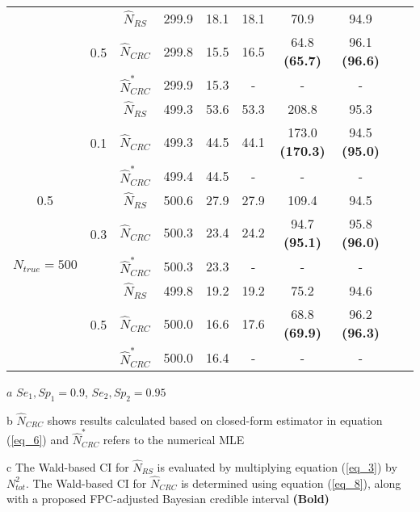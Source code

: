 \documentclass[useAMS,usenatbib,referee]{biom}
\begin{document}
\begin{table}
\begin{threeparttable}[b]
\begin{tabular}{cccccccccc}
     & \multirow{3}{*}{0.5}  & $\hat{N}_{RS}$ & 299.9 & 18.1 & 18.1 & 70.9 & 94.9    \\ \cline{3-8}
     & ~ & $\hat{N}_{CRC}$ & 299.8 & 15.5 & 16.5 & 64.8 \textbf{(65.7)} & 96.1 \textbf{(96.6)}   \\ \cline{3-8}
    ~ & ~ & $\hat{N}_{CRC}^*$ &  299.9 & 15.3  & - & - & -   \\ \hline
    
    & \multirow{3}{*}{0.1} & $\hat{N}_{RS}$ & 499.3 & 53.6 & 53.3 & 208.8 & 95.3  \\ \cline{3-8}
     & ~ & $\hat{N}_{CRC}$ &  499.3 & 44.5 & 44.1 & 173.0 \textbf{(170.3)} & 94.5 \textbf{(95.0)}  \\ \cline{3-8}
    ~ & ~ & $\hat{N}_{CRC}^*$ & 499.4 & 44.5 & - & - & -   \\ \cline{2-8}
    
    0.5 & \multirow{3}{*}{0.3}  & $\hat{N}_{RS}$ & 500.6 & 27.9 & 27.9 & 109.4 & 94.5  \\ \cline{3-8}
     & ~ & $\hat{N}_{CRC}$ & 500.3 & 23.4 & 24.2 & 94.7 \textbf{(95.1)} & 95.8 \textbf{(96.0)} \\ \cline{3-8}
     $N_{true}=500$ & ~ & $\hat{N}_{CRC}^*$ & 500.3 & 23.3 & - & - & -   \\ \cline{2-8}
    
     & \multirow{3}{*}{0.5}  & $\hat{N}_{RS}$ & 499.8 & 19.2 & 19.2 & 75.2 & 94.6   \\ \cline{3-8}
     & ~ & $\hat{N}_{CRC}$ & 500.0 & 16.6 & 17.6 & 68.8 \textbf{(69.9)} & 96.2 \textbf{(96.3)}   \\ \cline{3-8}
    ~ & ~ & $\hat{N}_{CRC}^*$ &  500.0 & 16.4   & - & - & -   \\ \hline
    \end{tabular}
    \begin{tablenotes}
        \item[$a$] \footnotesize $Se_1, Sp_1=0.9$, $Se_2, Sp_2=0.95$
        \item[b] \footnotesize $\hat{N}_{CRC}$ shows results calculated based on closed-form estimator in equation (\ref{eq_6}) and $\hat{N}_{CRC}^*$ refers to the numerical MLE
        \item[c] The Wald-based CI for $\hat{N}_{RS}$ is evaluated by multiplying equation (\ref{eq_3}) by $N_{tot}^2$. The Wald-based CI for $\hat{N}_{CRC}$ is determined using equation (\ref{eq_8}), along with a proposed FPC-adjusted Bayesian credible interval \textbf{(Bold)}
  \end{tablenotes}
   \end{threeparttable}
\end{table}
\end{document}
